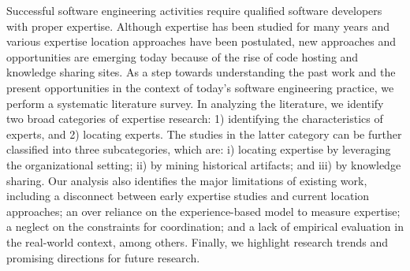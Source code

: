 




\thesisabstract
{
Successful software engineering activities require qualified software developers with proper expertise. Although expertise has been studied for many years and various expertise location approaches have been postulated, new approaches and opportunities are emerging today because of the rise of code hosting and knowledge sharing sites. As a step towards understanding the past work and the present opportunities in the context of today's software engineering practice, we perform a systematic literature survey. In analyzing the literature, we identify two broad categories of expertise research: 1) identifying the characteristics of experts, and 2) locating experts. The studies in the latter category can be further classified into three subcategories, which are: i) locating expertise by leveraging the organizational setting; ii) by mining historical artifacts; and iii) by knowledge sharing. Our analysis also identifies the major limitations of existing work, including a disconnect between early expertise studies and current location approaches; an over reliance on the experience-based model to measure expertise; a neglect on the constraints for coordination; and a lack of empirical evaluation in the real-world context, among others. Finally, we highlight research trends and promising directions for future research.
}


